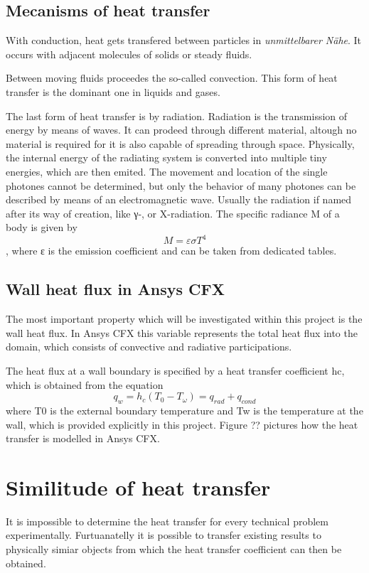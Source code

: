 \subsection{Mecanisms of heat transfer}
With conduction, heat gets transfered between particles in \emph{unmittelbarer Nähe}. It occurs with adjacent molecules of solids or steady fluids.

Between moving fluids proceedes the so-called convection. This form of heat transfer is the dominant one in liquids and gases.

The last form of heat transfer is by radiation. Radiation is the transmission of energy by means of waves. It can prodeed through different material, altough no material is required for it is also capable of spreading through space. Physically, the internal energy of the radiating system is converted into multiple tiny energies, which are then emited. The movement and location of the single photones cannot be determined, but only the behavior of many photones can be described by means of an electromagnetic wave. Usually the radiation if named after its way of creation, like γ-, or X-radiation. 
The specific radiance M of a body is given by
\begin{equation}
M = \varepsilon \sigma T^4
\end{equation},
where ε is the emission coefficient and can be taken from dedicated tables.
\subsection{Wall heat flux in Ansys CFX}
The most important property which will be investigated within this project is the wall heat flux. In Ansys CFX this variable represents the total heat flux into the domain, which consists of convective and radiative participations.

The heat flux at a wall boundary is specified by a heat transfer coefficient hc, which is obtained from the equation
\begin{equation}
q_w = h_c (T_0 - T_\omega ) = q_{rad} + q_{cond}
\end{equation}
where T0 is the external boundary temperature and Tw is the temperature at the wall, which is provided explicitly in this project. Figure ?? pictures how the heat transfer is modelled in Ansys CFX.
\section{Similitude of heat transfer}
It is impossible to determine the heat transfer for every technical problem experimentally. Furtuanatelly it is possible to transfer existing results to physically simiar objects from which the heat transfer coefficient can then be obtained.

